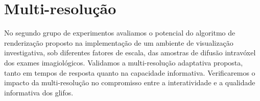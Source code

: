 


\section{Multi-resolução}
\label{sec::multi_resolução_e_performance_em_ambiente_de visualização_multimodal}

No segundo grupo de experimentos avaliamos o potencial do algoritmo de renderização proposto na implementação de um ambiente de visualização investigativa, sob diferentes fatores de escala, das amostras de difusão intravóxel dos exames imagiológicos. Validamos a  multi-resolução adaptativa proposta, tanto em tempos de resposta quanto na capacidade informativa. Verificaremos o impacto da multi-resolução no compromisso entre a interatividade e a qualidade informativa dos glifos.











